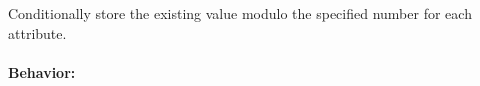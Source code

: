 Conditionally store the existing value modulo the specified number for each
attribute.

\paragraph{Behavior:}
\begin{itemize}[noitemsep]


\end{itemize}
